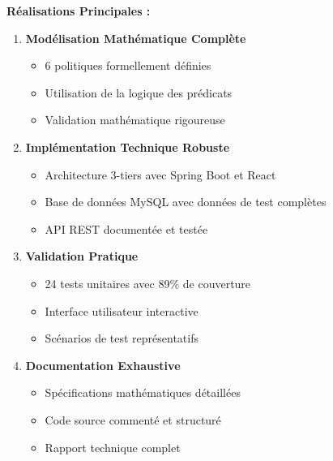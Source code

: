 \documentclass[12pt,a4paper]{article}
\begin{document}
    \begin{resultbox}
        \textbf{Réalisations Principales :}

        \begin{enumerate}
            \item \textbf{Modélisation Mathématique Complète}
            \begin{itemize}
                \item 6 politiques formellement définies
                \item Utilisation de la logique des prédicats
                \item Validation mathématique rigoureuse
            \end{itemize}

            \item \textbf{Implémentation Technique Robuste}
            \begin{itemize}
                \item Architecture 3-tiers avec Spring Boot et React
                \item Base de données MySQL avec données de test complètes
                \item API REST documentée et testée
            \end{itemize}

            \item \textbf{Validation Pratique}
            \begin{itemize}
                \item 24 tests unitaires avec 89\% de couverture
                \item Interface utilisateur interactive
                \item Scénarios de test représentatifs
            \end{itemize}

            \item \textbf{Documentation Exhaustive}
            \begin{itemize}
                \item Spécifications mathématiques détaillées
                \item Code source commenté et structuré
                \item Rapport technique complet
            \end{itemize}
        \end{enumerate}
    \end{resultbox}
\end{document}
